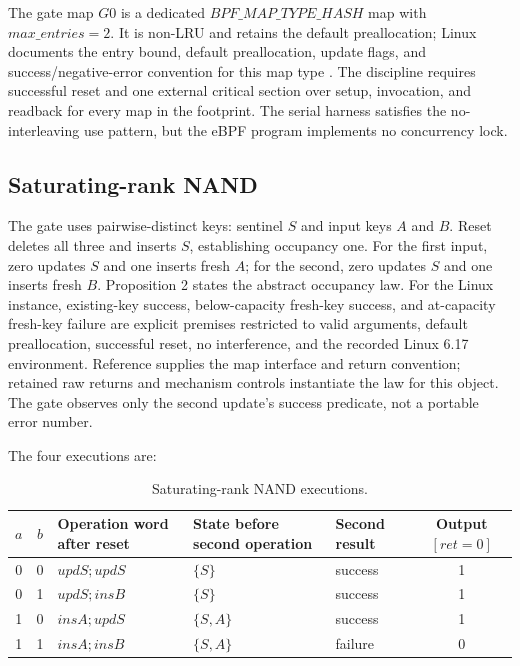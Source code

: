 \documentclass[conference]{IEEEtran}
\begin{document}
The gate map $G0$ is a dedicated $\mathit{BPF\_MAP\_TYPE\_HASH}$ map with $\mathit{max\_entries}=2$. It is non-LRU and retains the default preallocation; Linux documents the entry bound, default preallocation, update flags, and success/negative-error convention for this map type \cite{ref8}. The discipline requires successful reset and one external critical section over setup, invocation, and readback for every map in the footprint. The serial harness satisfies the no-interleaving use pattern, but the eBPF program implements no concurrency lock.

\subsection{Saturating-rank NAND}

The gate uses pairwise-distinct keys: sentinel $S$ and input keys $A$ and $B$. Reset deletes all three and inserts $S$, establishing occupancy one. For the first input, zero updates $S$ and one inserts fresh $A$; for the second, zero updates $S$ and one inserts fresh $B$. Proposition 2 states the abstract occupancy law. For the Linux instance, existing-key success, below-capacity fresh-key success, and at-capacity fresh-key failure are explicit premises restricted to valid arguments, default preallocation, successful reset, no interference, and the recorded Linux 6.17 environment. Reference \cite{ref8} supplies the map interface and return convention; retained raw returns and mechanism controls instantiate the law for this object. The gate observes only the second update's success predicate, not a portable error number.

The four executions are:

\begin{table}[t]
\caption{Saturating-rank NAND executions.}
\label{tab:nand}
\centering
\scriptsize
\begin{tabular}{@{}ccp{}p{}p{}c@{}}
\toprule
$a$ & $b$ & Operation word after reset & State before second operation & Second result & Output $[\mathit{ret}=0]$ \\
\midrule
0 & 0 & $\mathit{updS};\mathit{updS}$ & $\{S\}$ & success & 1 \\
0 & 1 & $\mathit{updS};\mathit{insB}$ & $\{S\}$ & success & 1 \\
1 & 0 & $\mathit{insA};\mathit{updS}$ & $\{S,A\}$ & success & 1 \\
1 & 1 & $\mathit{insA};\mathit{insB}$ & $\{S,A\}$ & failure & 0 \\
\bottomrule
\end{tabular}
\end{table}
\end{document}
